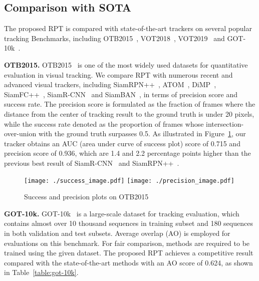 \documentclass[runningheads]{llncs}
\begin{document}
\subsection{Comparison with SOTA}
The proposed RPT is compared with state-of-the-art trackers on several
popular tracking Benchmarks, including OTB2015~\cite{OTB2015}, VOT2018~\cite{VOT2018}, VOT2019~\cite{VOT2019} and
GOT-10k~\cite{GOT-10k}.

\textbf{OTB2015.} OTB2015~\cite{OTB2015} is one of the most widely used datasets for
quantitative evaluation in visual tracking. We compare RPT with numerous
recent and advanced visual trackers, including SiamRPN++~\cite{siamrpn++}, ATOM~\cite{atom}, DiMP~\cite{dimp},
SiamFC++~\cite{siamfc++}, SiamR-CNN~\cite{siamrcnn} and SiamBAN~\cite{siamban}, in terms of precision score and success
rate. The precision score is formulated as the fraction of frames where
the distance from the center of tracking result to the ground truth is
under 20 pixels, while the success rate denoted as the proportion of
frames whose intersection-over-union with the ground truth surpasses
0.5. As illustrated in Figure~\ref{fig:OTBresults}, our tracker obtains an AUC (area under
curve of success plot) score of 0.715 and precision score of 0.936,
which are 1.4 and 2.2 percentage points higher than the previous best
result of SiamR-CNN~\cite{siamrcnn} and SiamRPN++~\cite{siamrpn++}.

\begin{figure}[t]
\centering
\texttt{[image: ./success\_image.pdf]}
\texttt{[image: ./precision\_image.pdf]}
\caption{Success and precision plots on OTB2015}
\label{fig:OTBresults}
\end{figure}

\textbf{GOT-10k.} GOT-10k~\cite{GOT-10k} is a large-scale dataset for tracking
evaluation, which contains almost over 10 thousand sequences in training
subset and 180 sequences in both validation and test subsets. Average
overlap (AO) is employed for evaluations on this benchmark. For fair
comparison, methods are required to be trained using the given dataset.
The proposed RPT achieves a competitive result compared with the
state-of-the-art methods with an AO score of 0.624, as shown in Table~\ref{table:got-10k}.
\end{document}
